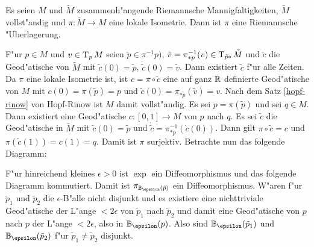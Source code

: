\begin{Prop}\label{prop-9-12}
Es seien $M$ und $\tilde M$ zusammenh"angende Riemannsche Mannigfaltigkeiten, $\tilde M$ vollst"andig und $\pi: \tilde M \to M$ eine lokale Isometrie. Dann ist $\pi$ eine Riemannsche "Uberlagerung.
\end{Prop}

\begin{bew}
F"ur $p \in M$ und $v \in \operatorname{T}_pM$ seien $\tilde p \in \pi^{-1}p)$, $\tilde v = \pi_{*p}^{-1}(v) \in \operatorname{T}_{\tilde p *}\tilde M$ und $\tilde c$ die Geod"atische von $\tilde M$ mit $\tilde c(0) = \tilde p$, $\dot{\tilde{c}}(0) = \tilde v$.
Dann existiert $\tilde c$ f"ur alle Zeiten. Da $\pi$ eine lokale Isometrie ist, ist $c = \pi \circ \tilde c$ eine auf ganz $\operatorname{\mathbb{R}}$ definierte Geod"atische von $M$ mit $c(0) = \pi(\tilde p) = p$ und $\tilde c(0) = \pi_{* \tilde p}(\tilde v) = v$.
Nach dem Satz \ref{hopf-rinow} von Hopf-Rinow ist $M$ damit vollst"andig. Es sei $p = \pi(\tilde p)$ und sei $q \in M$.
Dann existiert eine Geod"atische $c: [0,1] \to M$ von $p$ nach $q$. Es sei $\tilde c$ die Geod"atische in $\tilde M$ mit $\tilde c(0) = \tilde p$ und $\dot{\tilde{c}} = \pi_{*p}^{-1}(\dot c(0))$.
Dann gilt $\pi \circ \tilde c = c$ und $\pi(\tilde c(1)) = c(1) = q$.
Damit ist $\pi$ surjektiv. Betrachte nun das folgende Diagramm:
\begin{center}\end{center}
F"ur hinreichend kleines $\epsilon > 0$ ist $\exp$ ein Diffeomorphismus und das folgende Diagramm kommutiert.
Damit ist $\pi_{\B_\epsilon(\tilde p)}$ ein Diffeomorphismus.
W"aren f"ur $\tilde p_1$ und $\tilde p_2$ die $\epsilon$-B"alle nicht disjunkt und es existiere eine nichttriviale Geod"atische der L"ange $< 2 \epsilon$ von $\tilde p_1$ nach $\tilde p_2$ und damit eine Geod"atische von $p$ nach $p$ der L"ange $< 2 \epsilon$, also in $\B_\epsilon(p)$.
Also sind $\B_\epsilon(\tilde p_1)$ und $\B_\epsilon(\tilde p_2)$ f"ur $\tilde p_1 \ne \tilde p_2$ disjunkt.
\end{bew}

